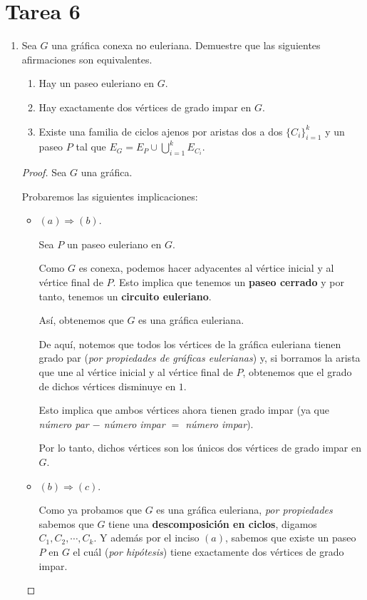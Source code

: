 \documentclass{article}
\begin{document}
\section*{\LARGE{Tarea 6}}
\begin{enumerate}
\item Sea $G$ una gr\'afica conexa no euleriana.   Demuestre que
  las siguientes afirmaciones son equivalentes.
  \begin{enumerate}
  \item Hay un paseo euleriano en $G$.

  \item Hay exactamente dos v\'ertices de grado impar en $G$.

  \item Existe una familia de ciclos ajenos por aristas dos
    a dos $\{ C_i \}_{i=1}^k$ y un paseo $P$ tal que
    $E_G = E_P \cup \bigcup_{i=1}^k E_{C_i}$.
  \end{enumerate}

  \begin{proof}
    Sea $G$ una gráfica.

    Probaremos las siguientes implicaciones:
    \begin{itemize}
    \item $(a) \Longrightarrow (b)$.

      Sea $P$ un paseo euleriano en $G$.

      Como $G$ es conexa, podemos hacer adyacentes al vértice inicial y al vértice final de $P$. Esto implica que tenemos un \textbf{paseo cerrado} y por tanto, tenemos un \textbf{circuito euleriano}.

      Así, obtenemos que $G$ es una gráfica euleriana.

      De aquí, notemos que todos los vértices de la gráfica euleriana tienen grado par (\textit{por propiedades de gráficas eulerianas}) y, si borramos la arista que une al vértice inicial y al vértice final de $P$, obtenemos que el grado de dichos vértices disminuye en $1$.

      Esto implica que ambos vértices ahora tienen grado impar (ya que \textit{número par $-$ número impar $=$ número impar}).

      Por lo tanto, dichos vértices son los únicos dos vértices de grado impar en $G$.

    \item $(b) \Longrightarrow (c)$.

      Como ya probamos que $G$ es una gráfica euleriana, \textit{por propiedades} sabemos que $G$ tiene una \textbf{descomposición en ciclos}, digamos $C_{1}, C_{2}, \cdots, C_{k}$. Y además por el inciso $(a)$, sabemos que existe un paseo $P$ en $G$ el cuál (\textit{por hipótesis}) tiene exactamente dos vértices de grado impar.


\end{itemize}
\end{proof}
\end{enumerate}
\end{document}
